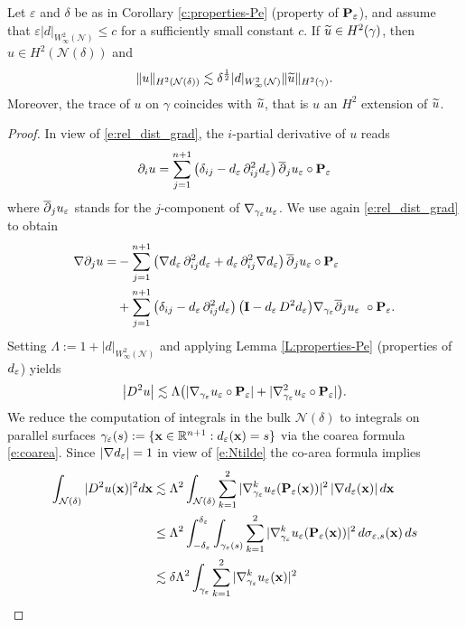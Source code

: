 \begin{proposition}[$H^2$ extension]\label{P:H2-extension}
Let $\varepsilon$ and $\delta$ be as in Corollary \ref{c:properties-Pe}
(property of ${{\bf P}_\varepsilon}$), and assume that $\varepsilon |d|_{W_\infty^2(\mathcal{N})}\le c$
for a sufficiently small constant $c$.  
If $\widetilde{u}\in H^2(\gamma)$, then $u\in H^2({\mathcal N(\delta)})$ and 
%
\[
\|u\|_{H^2({\mathcal N(\delta)})} \lesssim \delta^{\frac12} |d|_{W^2_\infty(\mathcal N)} \|\widetilde{u}\|_{H^2(\gamma)}.
\]
%
Moreover, the trace of $u$ on $\gamma$ coincides with $\widetilde{u}$, that is $u$ an $H^2$
extension of $\widetilde{u}$.
\end{proposition}
%
\begin{proof}
In view of \eqref{e:rel_dist_grad}, the $i$-partial derivative of $u$ reads
%  
\[
\partial_i u = \sum_{j=1}^{n+1} \big( \delta_{ij} - d_\varepsilon \, \partial_{ij}^2d_\varepsilon \big)
\, \overline{\partial}_ju_\varepsilon\circ{{\bf P}_\varepsilon}
\]
%
where $\overline{\partial}_ju_\varepsilon$ stands for the $j$-component of $\nabla_{\gamma_\varepsilon}u_\varepsilon$.
We use again \eqref{e:rel_dist_grad} to obtain
%
\begin{align*}
\nabla \partial_j u = &- \sum_{j=1}^{n+1} \big( \nabla d_\varepsilon \, \partial_{ij}^2d_\varepsilon
+ d_\varepsilon  \, \partial_{ij}^2\nabla d_\varepsilon \big) \, \overline{\partial}_ju_\varepsilon\circ{{\bf P}_\varepsilon}
\\ &+ \sum_{j=1}^{n+1} \big( \delta_{ij} - d_\varepsilon \, \partial_{ij}^2d_\varepsilon  \big)
\, \big( {\bf I} - d_\varepsilon \, D^2 d_\varepsilon \big) \nabla_{\gamma_\varepsilon} \overline{\partial}_ju_\varepsilon\ \circ {{\bf P}_\varepsilon}.
\end{align*}
%
Setting $\Lambda := 1 + |d|_{W^2_\infty(\mathcal N)}$ and
applying Lemma \ref{L:properties-Pe} (properties of $d_\varepsilon$) yields
%
\[
\big| D^2 u \big| \lesssim \Lambda
\big( |\nabla_{\gamma_\varepsilon}u_\varepsilon\circ{{\bf P}_\varepsilon}| + |\nabla_{\gamma_\varepsilon}^2 u_\varepsilon\circ{{\bf P}_\varepsilon}| \big).
\]
%
We reduce the computation of integrals in the bulk ${\mathcal N(\delta)}$ to integrals on
parallel surfaces ${\gamma_\varepsilon}(s) := \{{\bf x}\in\mathbb{R}^{n+1}: d_\varepsilon({\bf x}) = s\}$ via the
coarea formula \eqref{e:coarea}. 
%
Since $|\nabla d_\varepsilon|=1$ in view of \eqref{e:Ntilde} the co-area formula implies
%
\begin{align*}
\int_{\mathcal N(\delta)} |D^2 u(\bx)|^2 d\bx & \lesssim \Lambda^2 \int_{\mathcal N(\delta)}
\sum_{k=1}^2|\nabla_\gae^k\ue(\bPe(\bx))|^2 \, |\nabla\wde(\bx)| \, d\bx
\\ & \le  \Lambda^2 \int_{-{\delta_\varepsilon}}^{{\delta_\varepsilon}} \int_{\gae(s)}
\sum_{k=1}^2|\nabla_\gae^k\ue(\bPe(\bx))|^2 \, d \sigma_{\varepsilon,s}(\bx) \, ds
\\& \lesssim \delta  \Lambda^2 \int_\gae \sum_{k=1}^2|\nabla_\gae^k\ue(\bx)|^2

\end{align*}
\end{proof}
